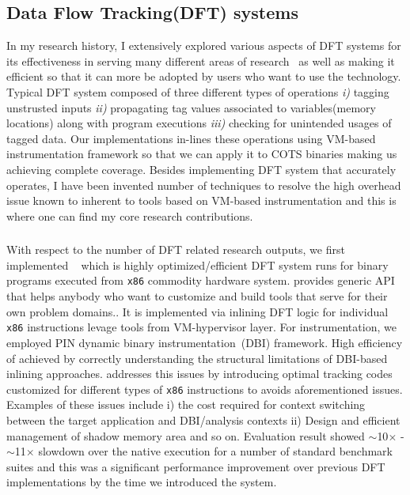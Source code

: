 \documentclass[letterpaper, 10pt]{article}
\begin{document}
\begin{small}
\subsection*{Data Flow Tracking(DFT) systems} 
%
In my research history, I extensively explored various aspects of DFT systems
for its effectiveness in serving many different areas of
research~\cite{libdft:2012vee, tfa:2012ndss, sreplica:2013ccs} as well as
making it efficient so that it can more be adopted by users who want to use the
technology.
%
Typical DFT system composed of three different types of operations {\it i)}
tagging unstrusted inputs {\it ii)} propagating tag values associated to
variables(memory locations) along with program executions {\it iii)} checking
for unintended usages of tagged data. Our implementations in-lines these
operations using VM-based instrumentation framework so that we can apply it to
COTS binaries making us achieving complete coverage.
%
Besides implementing DFT system that accurately operates, I have been invented
number of techniques to resolve the high overhead issue known to inherent to
tools based on VM-based instrumentation and this is where one can find my core
research contributions.

\subsubsection*{\libdft}
With respect to the number of DFT related research outputs, we first
implemented \libdft~\cite{libdft:2012vee} which is highly optimized/efficient
DFT system runs for binary programs executed from {\tt x86} commodity hardware
system. \libdft provides generic API that helps anybody who want to customize
and build tools that serve for their own problem domains..
%
It is implemented via inlining DFT logic for individual {\tt x86} instructions
 levage tools from VM-hypervisor layer. For
instrumentation, we employed PIN dynamic binary instrumentation~(DBI)
framework. High efficiency of \libdft achieved by correctly understanding the
structural limitations of DBI-based inlining approaches. \libdft addresses this
issues by introducing optimal tracking codes customized for different types of
{\tt x86} instructions to avoids aforementioned issues. Examples of these
issues include i) the cost required for context switching between the target
application and DBI/analysis contexts ii) Design and efficient management of
shadow memory area and so on. 
%
Evaluation result showed $\sim$10$\times$ - $\sim$11$\times$ slowdown over the
native execution for a number of standard benchmark suites and this was a
significant performance improvement over previous DFT implementations by the
time we introduced the system.


\end{small}
\end{document}
